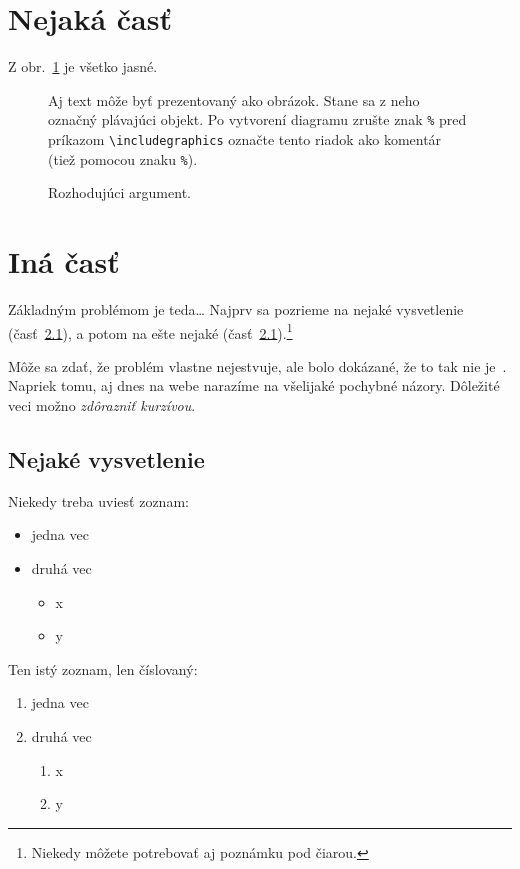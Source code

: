 \documentclass[10pt,twocolumn,slovak,a4paper]{coursepaper}
\begin{document}
\section{Nejaká časť} \label{nejaka}

Z obr.~\ref{f:rozhod} je všetko jasné. 

\begin{figure}[tbh]
\centering
Aj text môže byť prezentovaný ako obrázok. Stane sa z neho označný plávajúci objekt. Po vytvorení diagramu zrušte znak \texttt{\%} pred príkazom \verb|\includegraphics| označte tento riadok ako komentár (tiež pomocou znaku \texttt{\%}).
\caption{Rozhodujúci argument.}
\label{f:rozhod}
\end{figure}



\section{Iná časť} \label{ina}

Základným problémom je teda\ldots{} Najprv sa pozrieme na nejaké vysvetlenie (časť~\ref{ina:nejake}), a potom na ešte nejaké (časť~\ref{ina:nejake}).\footnote{Niekedy môžete potrebovať aj poznámku pod čiarou.}

Môže sa zdať, že problém vlastne nejestvuje\cite{Coplien:MPD}, ale bolo dokázané, že to tak nie je~\cite{Czarnecki:Staged, Czarnecki:Progress}. Napriek tomu, aj dnes na webe narazíme na všelijaké pochybné názory\cite{PLP-Framework}. Dôležité veci možno \emph{zdôrazniť kurzívou}.


\subsection{Nejaké vysvetlenie} \label{ina:nejake}

Niekedy treba uviesť zoznam:

\begin{itemize}
\item jedna vec
\item druhá vec
	\begin{itemize}
	\item x
	\item y
	\end{itemize}
\end{itemize}

Ten istý zoznam, len číslovaný:

\begin{enumerate}
\item jedna vec
\item druhá vec
	\begin{enumerate}
	\item x
	\item y
	\end{enumerate}
\end{enumerate}
\end{document}
